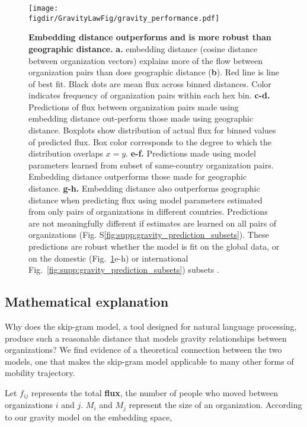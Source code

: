 \documentclass[12pt]{article} %
\def\figdir{../Figs}
\begin{document}
%
%
\begin{figure}[h!]
	\centering
	\texttt{[image: \\figdir/GravityLawFig/gravity\_performance.pdf]}
	\caption{
		\textbf{Embedding distance outperforms and is more robust than geographic distance.}
		\textbf{a.} embedding distance (cosine distance between organization vectors) explains more of the flow between organization pairs than does geographic distance (\textbf{b}). 
		Red line is line of best fit. 
		Black dots are mean flux across binned distances.
		Color indicates frequency of organization pairs within each hex bin.
		\textbf{c-d.} Predictions  of flux between organization pairs made using embedding distance out-perform those made using geographic distance. 
		Boxplots show distribution of actual flux for binned values of predicted flux.
		Box color corresponds to the degree to which the distribution overlaps $x = y$.
		\textbf{e-f.} Predictions made using model parameters learned from subset of same-country organization pairs. 
		Embedding distance outperforms those made for geographic distance.
		\textbf{g-h.} Embedding distance also outperforms geographic distance when predicting flux using model parameters estimated from only pairs of organizations in different countries. 
		Predictions are not meaningfully different if estimates are learned on all pairs of organizations (Fig. S\ref{fig:supp:gravity_prediction_subsets}).
		These predictions are robust whether the model is fit on the global data, or on the domestic (Fig.~\ref{fig:gravity_performance}e-h) or international Fig.~\ref{fig:supp:gravity_prediction_subsets}) subsets .
	}
	\label{fig:gravity_performance}
\end{figure}


%
%
\subsection*{Mathematical explanation}

Why does the skip-gram model, a tool designed for natural language processing, produce such a reasonable distance that models gravity relationships between organizations?
We find evidence of a theoretical connection between the two models, one that makes the skip-gram model applicable to many other forms of mobility trajectory. 

Let $f_{ij}$ represents the total \textbf{flux}, the number of people who moved between organizations $i$ and $j$. $M_{i}$ and $M_{j}$ represent the size of an organization. According to our gravity model on the embedding space,
\end{document}

